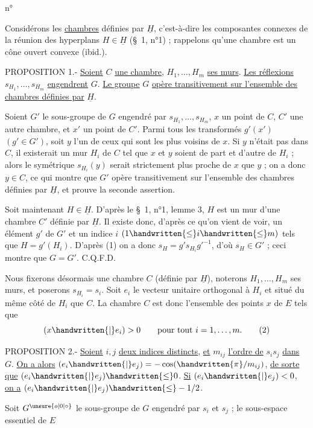 \begin{flushright}n°\end{flushright}
Considérons les \uline{chambres} définies par $\underline{H}$, c'est-à-dire les composantes connexes de la réunion des hyperplans $H\in\underline{H}$ (\S\ 1, n°1) ; rappelons qu'une chambre est un cône ouvert convexe (ibid.).

PROPOSITION 1.- \uline{Soient} $C$ \uline{une chambre}, $H_1,\ldots,H_m$ \uline{ses murs}. \uline{Les réflexions} $s_{H_1},\ldots,s_{H_m}$ \uline{engendrent} $G$. \uline{Le groupe} $G$ \uline{opère transitivement sur l'ensemble des chambres définies par} $\underline{H}$.

Soient $G'$ le sous-groupe de $G$ engendré par $s_{H_1},\ldots,s_{H_m}$, $x$ un point de $C$, $C'$ une autre chambre, et $x'$ un point de $C'$. Parmi tous les transformés $g'(x')$ $(g'\in G')$, soit $y$ l'un de ceux qui sont les plus voisins de $x$. Si $y$ n'était pas dans $C$, il existerait un mur $H_i$ de $C$ tel que $x$ et $y$ soient de part et d'autre de $H_i$ ; alors le symétrique $s_{H_i}(y)$ serait strictement plus proche de $x$ que $y$ ; on a donc $y\in C$, ce qui montre que $G'$ opère transitivement sur l'ensemble des chambres définies par $\underline{H}$, et prouve la seconde assertion.

Soit maintenant $H\in\underline{H}$. D'après le \S\ 1, n°1, lemme 3, $H$ est un mur d'une chambre $C'$ définie par $\underline{H}$. Il existe donc, d'après ce qu'on vient de voir, un élément $g'$ de $G'$ et un indice $i$ $(1\handwritten{\leq}i\handwritten{\leq}m)$ tels que $H=g'(H_i)$. D'après (1) on a donc $s_H=g's_{H_i}{g'}^{-1}$, d'où $s_H\in G'$ ; ceci montre que $G=G'$. C.Q.F.D.

Nous fixerons désormais une chambre $C$ (définie par $\underline{H}$), noterons $H_1,\ldots,H_m$ ses murs, et poserons $s_{H_i}=s_i$. Soit $e_i$ le vecteur unitaire orthogonal à $H_i$ et situé du même côté de $H_i$ que $C$. La chambre $C$ est donc l'ensemble des points $x$ de $E$ tels que
\[
(x\handwritten{|}e_i)>0\qquad\text{pour tout }i=1,\ldots,m.
\tag*{(2)}
\]

PROPOSITION 2.- \uline{Soient} $i,j$ \uline{deux indices distincts}, \uline{et} $m_{ij}$ \uline{l'ordre de} $s_i s_j$ \uline{dans} $G$. \uline{On a alors} $(e_i\handwritten{|}e_j)=-\cos(\handwritten{\pi}/m_{ij})$, \uline{de sorte que} $(e_i\handwritten{|}e_j)\handwritten{\leq}0$. \uline{Si} $(e_i\handwritten{|}e_j)<0$, \uline{on a} $(e_i\handwritten{|}e_j)\handwritten{\leq}-1/2$.

Soit $G^{\unsure{o|0|\circ}}$ le sous-groupe de $G$ engendré par $s_i$ et $s_j$ ; le sous-espace essentiel de $E$
